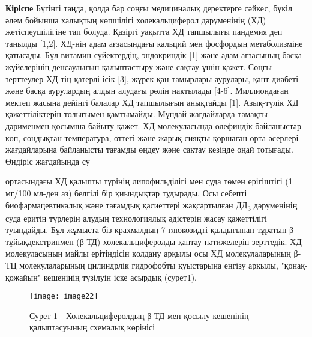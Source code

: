 \vspace{0.5em}

\begin{multicols}{2}
{\bfseries Кіріспе} Бүгінгі таңда, қолда бар соңғы медициналық деректерге
сәйкес, бүкіл әлем бойынша халықтың көпшілігі холекальциферол
дәруменінің (ХД) жетіспеушілігіне тап болуда. Қазіргі уақытта ХД
тапшылығы пандемия деп танылды {[}1,2{]}. ХД-нің адам ағзасындағы
кальций мен фосфордың метаболизміне қатысады. Бұл витамин сүйектердің,
эндокриндік {[}1{]} және адам ағзасының басқа жүйелерінің денсаулығын
қалыптастыру және сақтау үшін қажет. Соңғы зерттеулер ХД-тің қатерлі
ісік {[}3{]}, жүрек-қан тамырлары аурулары, қант диабеті және басқа
аурулардың алдын алудағы рөлін нақтылады {[}4-6{]}. Миллиондаған мектеп
жасына дейінгі балалар ХД тапшылығын анықтайды {[}1{]}. Азық-түлік ХД
қажеттіліктерін толығымен қамтымайды. Мұндай жағдайларда тамақты
дәрименмен қосымша байыту қажет. ХД молекуласында олефиндік байланыстар
көп, сондықтан температура, оттегі және жарық сияқты қоршаған орта
әсерлері жағдайларына байланысты тағамды өңдеу және сақтау кезінде оңай
тотығады. Өндіріс жағдайында су

ортасындағы ХД қалыпты түрінің липофильділігі мен суда төмен ерігіштігі
(1 мг/100 мл-ден аз) белгілі бір қиындықтар тудырады. Осы себепті
биофармацевтикалық және тағамдық қасиеттері жақсартылған
ДД\textsubscript{3} дәруменінің суда еритін түрлерін алудың
технологиялық әдістерін жасау қажеттілігі туындайды. Бұл жұмыста біз
крахмалдың 7 глюкозидті қалдығынан тұратын β-тұйықдекстринмен (β-ТД)
холекальциферолды қаптау нәтижелерін зерттедік. ХД молекуласының майлы
ерітіндісін қолдану арқылы осы ХД молекулаларының β-ТЦ молекулаларының
цилиндрлік гидрофобты қуыстарына енгізу арқылы, "қонақ-қожайын"
кешенінің түзілуін іске асырдық (сурет1).
\end{multicols}

\begin{figure}[H]
  \centering
  \texttt{[image: image22]}
  \caption*{Сурет 1 - Холекальциферолдың β-ТД-мен қосылу кешенінің қалыптасуының схемалық көрінісі}
\end{figure}

